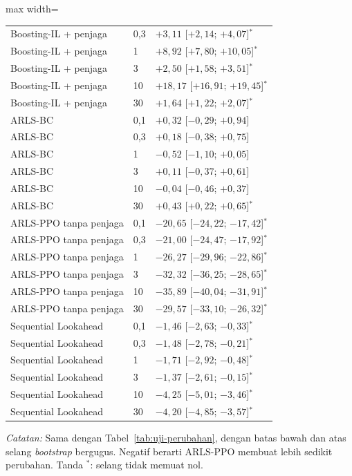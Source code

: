 \begin{table}[htbp]
\begin{adjustbox}{max width=\textwidth}
\begin{tabular}{lll}
Boosting-IL + penjaga & 0{,}3 & $+3{,}11$ [$+2{,}14$; $+4{,}07$]$^{*}$ \\
Boosting-IL + penjaga & 1 & $+8{,}92$ [$+7{,}80$; $+10{,}05$]$^{*}$ \\
Boosting-IL + penjaga & 3 & $+2{,}50$ [$+1{,}58$; $+3{,}51$]$^{*}$ \\
Boosting-IL + penjaga & 10 & $+18{,}17$ [$+16{,}91$; $+19{,}45$]$^{*}$ \\
Boosting-IL + penjaga & 30 & $+1{,}64$ [$+1{,}22$; $+2{,}07$]$^{*}$ \\
\addlinespace
ARLS-BC & 0{,}1 & $+0{,}32$ [$-0{,}29$; $+0{,}94$] \\
ARLS-BC & 0{,}3 & $+0{,}18$ [$-0{,}38$; $+0{,}75$] \\
ARLS-BC & 1 & $-0{,}52$ [$-1{,}10$; $+0{,}05$] \\
ARLS-BC & 3 & $+0{,}11$ [$-0{,}37$; $+0{,}61$] \\
ARLS-BC & 10 & $-0{,}04$ [$-0{,}46$; $+0{,}37$] \\
ARLS-BC & 30 & $+0{,}43$ [$+0{,}22$; $+0{,}65$]$^{*}$ \\
\addlinespace
ARLS-PPO tanpa penjaga & 0{,}1 & $-20{,}65$ [$-24{,}22$; $-17{,}42$]$^{*}$ \\
ARLS-PPO tanpa penjaga & 0{,}3 & $-21{,}00$ [$-24{,}47$; $-17{,}92$]$^{*}$ \\
ARLS-PPO tanpa penjaga & 1 & $-26{,}27$ [$-29{,}96$; $-22{,}86$]$^{*}$ \\
ARLS-PPO tanpa penjaga & 3 & $-32{,}32$ [$-36{,}25$; $-28{,}65$]$^{*}$ \\
ARLS-PPO tanpa penjaga & 10 & $-35{,}89$ [$-40{,}04$; $-31{,}91$]$^{*}$ \\
ARLS-PPO tanpa penjaga & 30 & $-29{,}57$ [$-33{,}10$; $-26{,}32$]$^{*}$ \\
\addlinespace
Sequential Lookahead & 0{,}1 & $-1{,}46$ [$-2{,}63$; $-0{,}33$]$^{*}$ \\
Sequential Lookahead & 0{,}3 & $-1{,}48$ [$-2{,}78$; $-0{,}21$]$^{*}$ \\
Sequential Lookahead & 1 & $-1{,}71$ [$-2{,}92$; $-0{,}48$]$^{*}$ \\
Sequential Lookahead & 3 & $-1{,}37$ [$-2{,}61$; $-0{,}15$]$^{*}$ \\
Sequential Lookahead & 10 & $-4{,}25$ [$-5{,}01$; $-3{,}46$]$^{*}$ \\
Sequential Lookahead & 30 & $-4{,}20$ [$-4{,}85$; $-3{,}57$]$^{*}$ \\
\bottomrule
\end{tabular}
\end{adjustbox}
\par\smallskip\footnotesize\textit{Catatan:} Sama dengan Tabel~\ref{tab:uji-perubahan}, dengan batas bawah dan atas selang \emph{bootstrap} bergugus. Negatif berarti ARLS-PPO membuat lebih sedikit perubahan. Tanda $^{*}$: selang tidak memuat nol.
\end{table}
